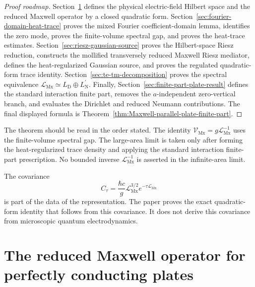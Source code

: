 \documentclass[11pt]{article}
\providecommand{\hbarc}{\hbar c}
\providecommand{\LMx}{\mathcal L_{\mathrm{Mx}}}
\providecommand{\VMx}{\mathcal V_{\mathrm{Mx}}}
\providecommand{\LD}{L_{\mathrm D}}
\providecommand{\LNp}{L_{\mathrm N}^{\prime}}
\providecommand{\Ctau}{C_{\tau}}
\numberwithin{equation}{section}
\begin{document}
\begin{proof}[Proof roadmap]
Section~\ref{sec:maxwell-operator} defines the physical electric-field Hilbert
space and the reduced Maxwell operator by a closed quadratic form.
Section~\ref{sec:fourier-domain-heat-trace} proves the mixed Fourier
coefficient-domain lemma, identifies the zero mode, proves the finite-volume
spectral gap, and proves the heat-trace estimates.  Section~\ref{sec:riesz-gaussian-source}
proves the Hilbert-space Riesz reduction, constructs the mollified
transversely reduced Maxwell Riesz mediator, defines the heat-regularized Gaussian
source, and proves the regulated quadratic-form trace identity.
Section~\ref{sec:te-tm-decomposition} proves the spectral equivalence
\(\LMx\simeq\LD\oplus\LNp\).  Finally,
Section~\ref{sec:finite-part-plate-result} defines the standard interaction
finite part, removes the \(a\)-independent zero-vertical branch, and evaluates
the Dirichlet and reduced Neumann contributions.  The final displayed formula
is Theorem~\ref{thm:Maxwell-parallel-plate-finite-part}.
\end{proof}

\begin{remark}
\label{rem:intro-finite-volume-discipline}
The theorem should be read in the order stated.  The identity
\(\VMx=g\LMx^{-1}\) uses the finite-volume spectral gap.  The large-area limit
is taken only after forming the heat-regularized trace density and applying the
standard interaction finite-part prescription.  No bounded inverse
\(\LMx^{-1}\) is asserted in the infinite-area limit.
\end{remark}

\begin{remark}
\label{rem:intro-prescribed-covariance}
The covariance
\[
    \Ctau=\frac{\hbarc}{g}\LMx^{3/2}e^{-\tau\LMx}
\]
is part of the data of the representation.  The paper proves the exact
quadratic-form identity that follows from this covariance.  It does not derive
this covariance from microscopic quantum electrodynamics.
\end{remark}
\section{The reduced Maxwell operator for perfectly conducting plates}
\label{sec:maxwell-operator}
\end{document}
